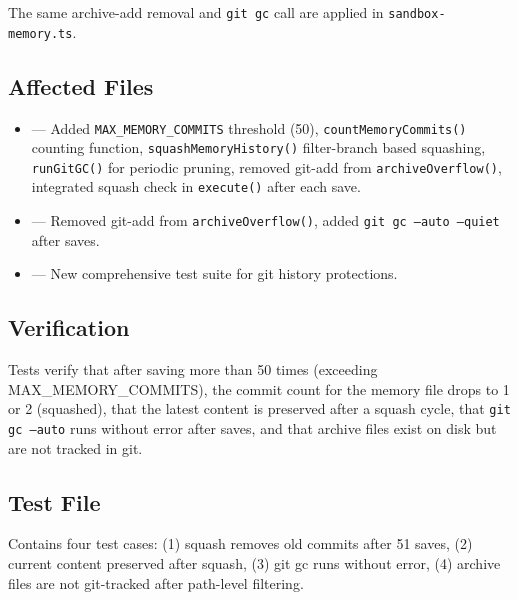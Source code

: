 The same archive-add removal and \texttt{git gc} call are applied in \texttt{sandbox-memory.ts}.

\subsection*{Affected Files}
\begin{itemize}
    \item {} --- Added \texttt{MAX\_MEMORY\_COMMITS} threshold (50), \texttt{countMemoryCommits()} counting function, \texttt{squashMemoryHistory()} filter-branch based squashing, \texttt{runGitGC()} for periodic pruning, removed git-add from \texttt{archiveOverflow()}, integrated squash check in \texttt{execute()} after each save.
    \item {} --- Removed git-add from \texttt{archiveOverflow()}, added \texttt{git gc --auto --quiet} after saves.
    \item {} --- New comprehensive test suite for git history protections.
\end{itemize}

\subsection*{Verification}
Tests verify that after saving more than 50 times (exceeding MAX\_MEMORY\_COMMITS), the commit count for the memory file drops to 1 or 2 (squashed), that the latest content is preserved after a squash cycle, that \texttt{git gc --auto} runs without error after saves, and that archive files exist on disk but are not tracked in git.

\subsection*{Test File}

Contains four test cases: (1) squash removes old commits after 51 saves, (2) current content preserved after squash, (3) git gc runs without error, (4) archive files are not git-tracked after path-level filtering.
